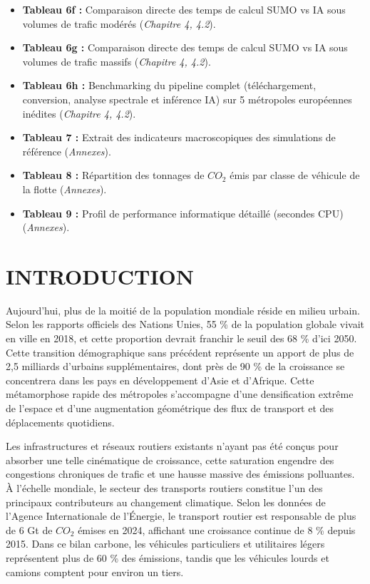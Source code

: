 \documentclass[10pt, a4paper]{article}
\begin{document}
\begin{itemize}
  \textbf{Tableau 6b :} Matrice comparative de la validation croisée
  étendue (IA vs SUMO) sur 9 villes inédites sous 3 scénarios de charge
  (\emph{Chapitre 4, 4.2}).
\item
  \textbf{Tableau 6f :} Comparaison directe des temps de calcul SUMO vs
  IA sous volumes de trafic modérés (\emph{Chapitre 4, 4.2}).
\item
  \textbf{Tableau 6g :} Comparaison directe des temps de calcul SUMO vs
  IA sous volumes de trafic massifs (\emph{Chapitre 4, 4.2}).
\item
  \textbf{Tableau 6h :} Benchmarking du pipeline complet
  (téléchargement, conversion, analyse spectrale et inférence IA) sur 5
  métropoles européennes inédites (\emph{Chapitre 4, 4.2}).
\item
  \textbf{Tableau 7 :} Extrait des indicateurs macroscopiques des
  simulations de référence (\emph{Annexes}).
\item
  \textbf{Tableau 8 :} Répartition des tonnages de \(CO_2\) émis par
  classe de véhicule de la flotte (\emph{Annexes}).
\item
  \textbf{Tableau 9 :} Profil de performance informatique détaillé
  (secondes CPU) (\emph{Annexes}).
\end{itemize}

\newpage

\section{INTRODUCTION}\label{introduction}

Aujourd'hui, plus de la moitié de la population mondiale réside en
milieu urbain. Selon les rapports officiels des Nations Unies, 55 \% de
la population globale vivait en ville en 2018, et cette proportion
devrait franchir le seuil des 68 \% d'ici 2050. Cette transition
démographique sans précédent représente un apport de plus de 2,5
milliards d'urbains supplémentaires, dont près de 90 \% de la croissance
se concentrera dans les pays en développement d'Asie et d'Afrique. Cette
métamorphose rapide des métropoles s'accompagne d'une densification
extrême de l'espace et d'une augmentation géométrique des flux de
transport et des déplacements quotidiens.

Les infrastructures et réseaux routiers existants n'ayant pas été conçus
pour absorber une telle cinématique de croissance, cette saturation
engendre des congestions chroniques de trafic et une hausse massive des
émissions polluantes. À l'échelle mondiale, le secteur des transports
routiers constitue l'un des principaux contributeurs au changement
climatique. Selon les données de l'Agence Internationale de l'Énergie,
le transport routier est responsable de plus de 6 Gt de \(CO_2\) émises
en 2024, affichant une croissance continue de 8 \% depuis 2015. Dans ce
bilan carbone, les véhicules particuliers et utilitaires légers
représentent plus de 60 \% des émissions, tandis que les véhicules
lourds et camions comptent pour environ un tiers.
\end{document}
